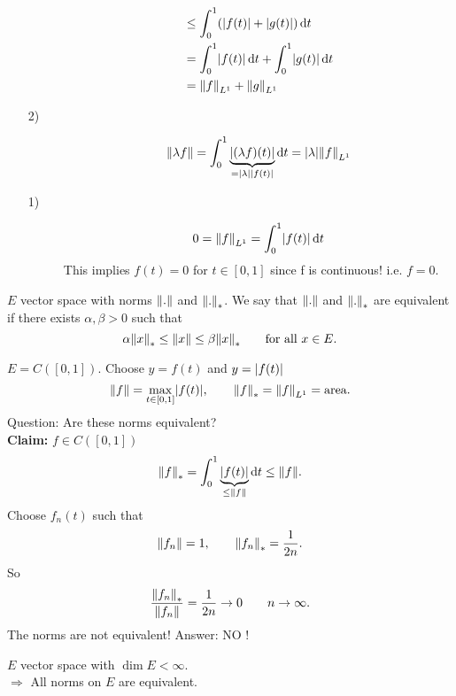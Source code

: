 \begin{beispiele}
\begin{enumerate}[(1)]
\begin{description}
\begin{align*}
			&\leq \int_{0}^{1}(\abs{f(t)}+ \abs{g(t)}) \,\mathrm{d}t \\
			&= \int_{0}^{1}\abs{f(t)} \,\mathrm{d}t + \int_{0}^{1}\abs{g(t)} \,\mathrm{d}t \\
			&= \norm{f}_{L^1} + \norm{g}_{L^1}
		\end{align*}
		\item[2)] \[
			\norm{\lambda f} = \int_{0}^{1} \underset{= \abs{\lambda}\abs{f(t)}}{\underbrace{\abs{(\lambda f)(t)}}} \,\mathrm{d}t = \abs{\lambda} \norm{f}_{L^1}
		\]
		\item[1)] \[
			0 = \norm{f}_{L^1} = \int_{0}^{1}\abs{f(t)} \,\mathrm{d}t
		\]
		This implies $f(t)=0$ for $t \in [0,1]$ since f is continuous! i.e. $f=0$.
	\end{description}
	\end{enumerate}
\end{beispiele}
\begin{theorem}
	$E$ vector space with norms $\norm{.}$ and $\norm{.}_{*}$. We say that $\norm{.}$ and $\norm{.}_{*}$ are equivalent if there exists $\alpha, \beta >0$ such that
	\[
		\alpha \norm{x}_{*} \leq \norm{x} \leq \beta \norm{x}_{*} \qquad \text{for all }x \in E.
	\]
\end{theorem}
\begin{beispiel}
		\item $E = C([0,1])$. Choose $y = f(t)$ and $y = \lvert f(t)\rvert$
		\[
			\norm{f} = \max\limits_{t \in [0,1]} \abs{f(t)}, \qquad \norm{f}_{*} = \norm{f}_{L^1} = \text{area}.
		\]
		Question: Are these norms equivalent? \\
		\textbf{Claim:} \text{    }   $f \in C([0,1])$ 
		\[
			\norm{f}_{*} = \int_{0}^{1} \underset{\leq \norm{f}}{\underbrace{\abs{f(t)}}} \,\mathrm{d}t \leq \norm{f}.
		\]
		Choose $f_n(t)$ such that
		\[
			\norm{f_n} = 1, \qquad \norm{f_n}_{*} = \frac{1}{2n}.
		\]
		So 
		\[
			\frac{\norm{f_n}_{*}}{\norm{f_n}} = \frac{1}{2n} \to 0 \qquad n \to \infty.
		\]
		The norms are not equivalent! Answer: NO ! 
	\end{beispiel}
\begin{theorem}
	$E$ vector space with $\dim E < \infty$.  \\
	$\Rightarrow $ All norms on $E$ are equivalent.
\end{theorem}
